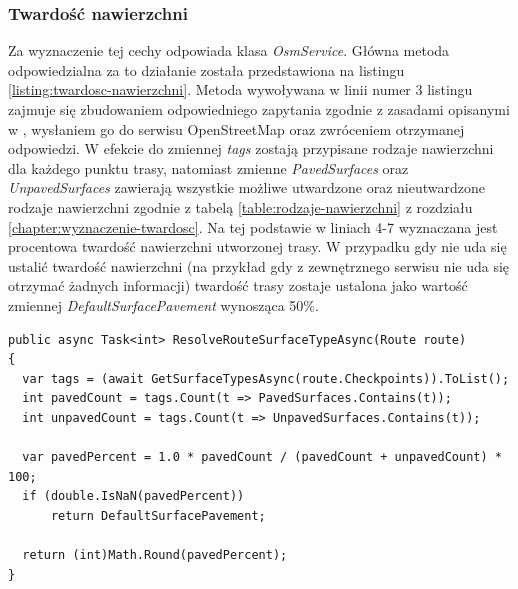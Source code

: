 \subsubsection{Twardość nawierzchni}
Za wyznaczenie tej cechy odpowiada klasa \textit{OsmService}. Główna metoda odpowiedzialna za to działanie została przedstawiona na listingu \ref{listing:twardosc-nawierzchni}. Metoda wywoływana w linii numer 3 listingu zajmuje się zbudowaniem odpowiedniego zapytania zgodnie z zasadami opisanymi w \cite{overpass-wiki}, wysłaniem go do serwisu OpenStreetMap \cite{osm} oraz zwróceniem otrzymanej odpowiedzi. W efekcie do zmiennej \textit{tags} zostają przypisane rodzaje nawierzchni dla każdego punktu trasy, natomiast zmienne \textit{PavedSurfaces} oraz \textit{UnpavedSurfaces} zawierają wszystkie możliwe utwardzone oraz nieutwardzone rodzaje nawierzchni zgodnie z tabelą \ref{table:rodzaje-nawierzchni} z rozdziału \ref{chapter:wyznaczenie-twardosc}. Na tej podstawie w liniach 4-7 wyznaczana jest procentowa twardość nawierzchni utworzonej trasy. 
W przypadku gdy nie uda się ustalić twardość nawierzchni (na przykład gdy z zewnętrznego serwisu nie uda się otrzymać żadnych informacji) twardość trasy zostaje ustalona jako wartość zmiennej \textit{DefaultSurfacePavement} wynosząca 50\%.
\begin{lstlisting}[caption={Wyznaczenie poziomu terenu},label=listing:twardosc-nawierzchni]
public async Task<int> ResolveRouteSurfaceTypeAsync(Route route)
{
  var tags = (await GetSurfaceTypesAsync(route.Checkpoints)).ToList();
  int pavedCount = tags.Count(t => PavedSurfaces.Contains(t));
  int unpavedCount = tags.Count(t => UnpavedSurfaces.Contains(t));

  var pavedPercent = 1.0 * pavedCount / (pavedCount + unpavedCount) * 100;
  if (double.IsNaN(pavedPercent))
      return DefaultSurfacePavement;

  return (int)Math.Round(pavedPercent);
}
\end{lstlisting}

